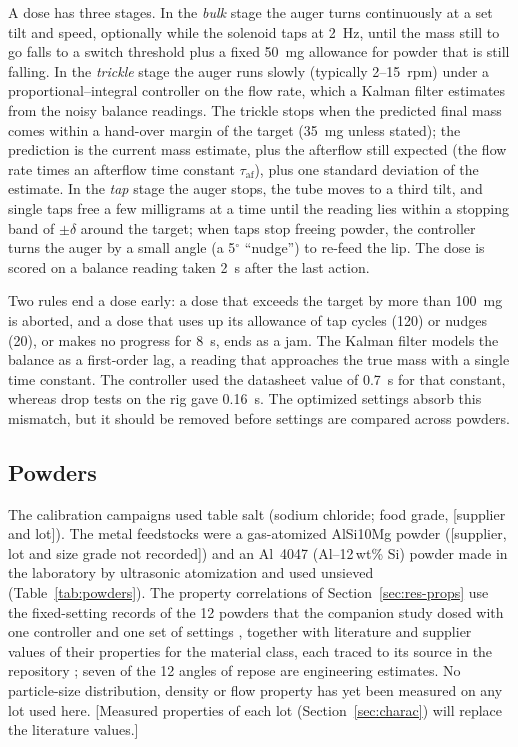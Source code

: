 \documentclass[preprint,12pt]{elsarticle}
\newcommand{\ph}[1]{\textcolor{orange!75!black}{\textsf{[#1]}}}
\begin{document}
A dose has three stages. In the \emph{bulk} stage the auger turns continuously at a set tilt and speed, optionally while the solenoid taps at 2~Hz, until the mass still to go falls to a switch threshold plus a fixed 50~mg allowance for powder that is still falling. In the \emph{trickle} stage the auger runs slowly (typically 2--15~rpm) under a proportional--integral controller on the flow rate, which a Kalman filter estimates from the noisy balance readings. The trickle stops when the predicted final mass comes within a hand-over margin of the target (35~mg unless stated); the prediction is the current mass estimate, plus the afterflow still expected (the flow rate times an afterflow time constant $\tau_\mathrm{af}$), plus one standard deviation of the estimate. In the \emph{tap} stage the auger stops, the tube moves to a third tilt, and single taps free a few milligrams at a time until the reading lies within a stopping band of $\pm\delta$ around the target; when taps stop freeing powder, the controller turns the auger by a small angle (a 5$^\circ$ ``nudge'') to re-feed the lip. The dose is scored on a balance reading taken 2~s after the last action.

Two rules end a dose early: a dose that exceeds the target by more than 100~mg is aborted, and a dose that uses up its allowance of tap cycles (120) or nudges (20), or makes no progress for 8~s, ends as a jam. The Kalman filter models the balance as a first-order lag, a reading that approaches the true mass with a single time constant. The controller used the datasheet value of 0.7~s for that constant, whereas drop tests on the rig gave 0.16~s. The optimized settings absorb this mismatch, but it should be removed before settings are compared across powders.

\subsection{Powders}
\label{sec:powders}

The calibration campaigns used table salt (sodium chloride; food grade, \ph{supplier and lot}). The metal feedstocks were a gas-atomized AlSi10Mg powder (\ph{supplier, lot and size grade not recorded}) and an Al~4047 (Al--12\,wt\% Si) powder made in the laboratory by ultrasonic atomization and used unsieved (Table~\ref{tab:powders}). The property correlations of Section~\ref{sec:res-props} use the fixed-setting records of the 12 powders that the companion study dosed with one controller and one set of settings \cite{Charles2026Open}, together with literature and supplier values of their properties for the material class, each traced to its source in the repository \cite{PowderDoserRepo}; seven of the 12 angles of repose are engineering estimates. No particle-size distribution, density or flow property has yet been measured on any lot used here. \ph{Measured properties of each lot (Section~\ref{sec:charac}) will replace the literature values.}
\end{document}
